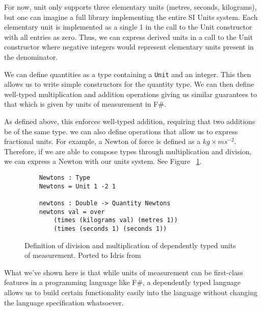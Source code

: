 For now, unit only supports three elementary units (metres, seconds, kilograms),
but one can imagine a full library implementing the entire SI Units system. Each
elementary unit is implemented as a single 1 in the call to the Unit constructor
with all entries as zero. Thus, we can express derived units in a call to the
Unit constructor where negative integers would represent elementary units
present in the denominator. 

We can define quantities as a type containing a \texttt{Unit} and an integer.
This then allows us to write simple constructors for the quantity type. We can
then define well-typed multiplication and addition operations giving us similar
guarantees to that which is given by units of measurement in F\#. 

As defined above, this enforces well-typed addition, requiring that two
additions be of the same type. we can also define operations that allow us to
express fractional units. For example, a Newton of force is defined as a
$kg\times ms^{-2}$. Therefore, if we are able to compose types through
multiplication and division, we can express a Newton with our units system. See
Figure ~\ref{division}. 

\begin{figure}[h]
  \caption{Definition of division and multiplication of dependently typed units
  of measurement. Ported to Idris from \cite{gundry2013}}
  \label{division}
  \begin{lstlisting}
    Newtons : Type
    Newtons = Unit 1 -2 1

    newtons : Double -> Quantity Newtons
    newtons val = over 
        (times (kilograms val) (metres 1)) 
        (times (seconds 1) (seconds 1))
  \end{lstlisting}
\end{figure}

What we've shown here is that while units of measurement can be first-class
features in a programming language like F\#, a dependently typed language allows
us to build certain functionality easily into the language without changing the
language specification whatsoever. 

